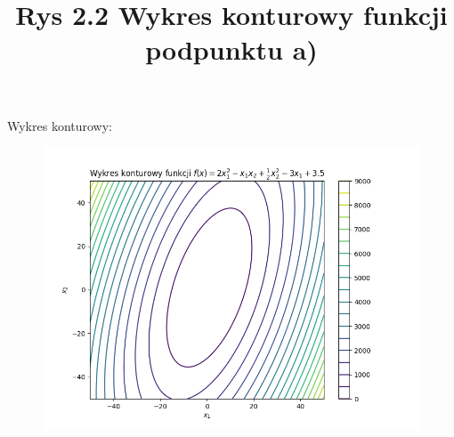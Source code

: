 \documentclass{article}
\begin{document}
\newpage
Wykres konturowy:
\begin{figure}[h]
  \includegraphics[scale=0.5]{Zad2a.png}
  \title{Rys 2.2 Wykres konturowy funkcji podpunktu a)}
  \centering
\end{figure}
\newpage
\end{document}
